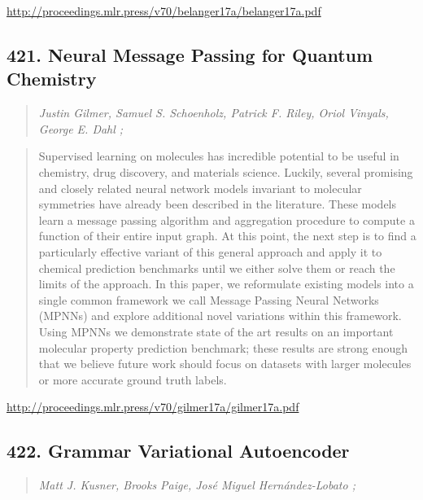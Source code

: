 \documentclass{article}
\begin{document}
\href{http://proceedings.mlr.press/v70/belanger17a/belanger17a.pdf}{http://proceedings.mlr.press/v70/belanger17a/belanger17a.pdf}

\subsection{421. Neural Message Passing for Quantum Chemistry}

\begin{quote}
\footnotesize{\textit{Justin Gilmer, Samuel S. Schoenholz, Patrick F. Riley, Oriol Vinyals, George E. Dahl ;}}
\end{quote}

\begin{quote}
    Supervised learning on molecules has incredible potential to be useful in chemistry, drug discovery, and materials science. Luckily, several promising and closely related neural network models invariant to molecular symmetries have already been described in the literature. These models learn a message passing algorithm and aggregation procedure to compute a function of their entire input graph. At this point, the next step is to find a particularly effective variant of this general approach and apply it to chemical prediction benchmarks until we either solve them or reach the limits of the approach. In this paper, we reformulate existing models into a single common framework we call Message Passing Neural Networks (MPNNs) and explore additional novel variations within this framework. Using MPNNs we demonstrate state of the art results on an important molecular property prediction benchmark; these results are strong enough that we believe future work should focus on datasets with larger molecules or more accurate ground truth labels.  \end{quote}

\href{http://proceedings.mlr.press/v70/gilmer17a/gilmer17a.pdf}{http://proceedings.mlr.press/v70/gilmer17a/gilmer17a.pdf}

\subsection{422. Grammar Variational Autoencoder}

\begin{quote}
\footnotesize{\textit{Matt J. Kusner, Brooks Paige, José Miguel Hernández-Lobato ;}}
\end{quote}
\end{document}
